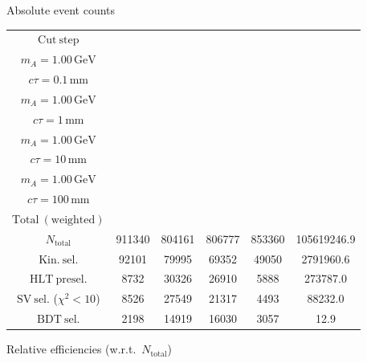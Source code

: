 \documentclass[10pt,a4paper]{article}
\renewcommand{\arraystretch}{1.4}
\begin{document}
{\footnotesize\setlength{\tabcolsep}{4pt}\renewcommand{\arraystretch}{1.05}%
\vspace{12pt}

Absolute event counts

\begin{tabular}{cccccc}
\toprule
$\mathrm{Cut\ step}$ & \shortstack{$m_{\pi}=10\,\mathrm{GeV}$\\$m_{A}=1.00\,\mathrm{GeV}$\\$c\tau=0.1\,\mathrm{mm}$} & \shortstack{$m_{\pi}=10\,\mathrm{GeV}$\\$m_{A}=1.00\,\mathrm{GeV}$\\$c\tau=1\,\mathrm{mm}$} & \shortstack{$m_{\pi}=10\,\mathrm{GeV}$\\$m_{A}=1.00\,\mathrm{GeV}$\\$c\tau=10\,\mathrm{mm}$} & \shortstack{$m_{\pi}=10\,\mathrm{GeV}$\\$m_{A}=1.00\,\mathrm{GeV}$\\$c\tau=100\,\mathrm{mm}$} & \shortstack{$\mathrm{QCD}$\\$\mathrm{Total\ (weighted)}$} \\
\midrule
$N_{\mathrm{total}}$ & 911340 & 804161 & 806777 & 853360 & 105619246.9\\
$\mathrm{Kin.\ sel.}$ & 92101 & 79995 & 69352 & 49050 & 2791960.6\\
$\mathrm{HLT\ presel.}$ & 8732 & 30326 & 26910 & 5888 & 273787.0\\
$\mathrm{SV\ sel.}$ ($\chi^2{<}10$) & 8526 & 27549 & 21317 & 4493 & 88232.0\\
$\mathrm{BDT\ sel.}$ & 2198 & 14919 & 16030 & 3057 & 12.9\\
\bottomrule
\end{tabular}

\vspace{18pt}

Relative efficiencies (w.r.t.\ $N_{\mathrm{total}}$)

}
\end{document}
